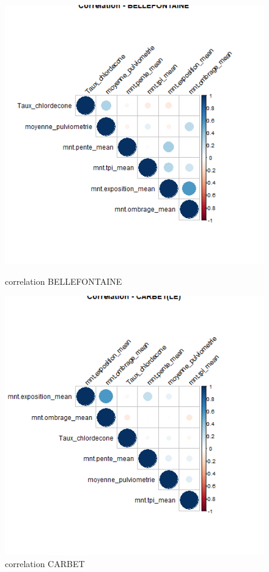 \documentclass{report}
\begin{document}
\begin{figure}[H]
\begin{minipage}[t]{0.45\linewidth}
\centering
\includegraphics[width =
0.6\linewidth]{correlation_BELLEFONTAINE.png}
\caption{correlation BELLEFONTAINE}
\end{minipage}
\hfill
\begin{minipage}[t]{0.45\linewidth}
\includegraphics[width = 0.6
\linewidth]{correlation_CARBET(LE).png}
\caption{correlation CARBET}
\end{minipage}
\end{figure}
\end{document}
